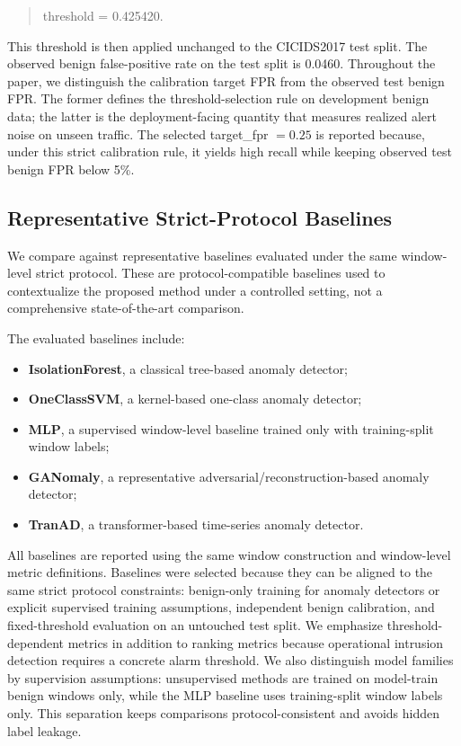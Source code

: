 \begin{quote}
threshold = 0.425420.
\end{quote}

This threshold is then applied unchanged to the CICIDS2017 test split. The observed benign false-positive rate on the test split is 0.0460. Throughout the paper, we distinguish the calibration target FPR from the observed test benign FPR. The former defines the threshold-selection rule on development benign data; the latter is the deployment-facing quantity that measures realized alert noise on unseen traffic. The selected target\_fpr \(=0.25\) is reported because, under this strict calibration rule, it yields high recall while keeping observed test benign FPR below 5\%.

\subsection{Representative Strict-Protocol Baselines}

We compare against representative baselines evaluated under the same window-level strict protocol. These are protocol-compatible baselines used to contextualize the proposed method under a controlled setting, not a comprehensive state-of-the-art comparison.

The evaluated baselines include:

\begin{itemize}
    \item \textbf{IsolationForest}, a classical tree-based anomaly detector;
    \item \textbf{OneClassSVM}, a kernel-based one-class anomaly detector;
    \item \textbf{MLP}, a supervised window-level baseline trained only with training-split window labels;
    \item \textbf{GANomaly}, a representative adversarial/reconstruction-based anomaly detector;
    \item \textbf{TranAD}, a transformer-based time-series anomaly detector.
\end{itemize}



All baselines are reported using the same window construction and window-level metric definitions. Baselines were selected because they can be aligned to the same strict protocol constraints: benign-only training for anomaly detectors or explicit supervised training assumptions, independent benign calibration, and fixed-threshold evaluation on an untouched test split. We emphasize threshold-dependent metrics in addition to ranking metrics because operational intrusion detection requires a concrete alarm threshold. We also distinguish model families by supervision assumptions: unsupervised methods are trained on model-train benign windows only, while the MLP baseline uses training-split window labels only. This separation keeps comparisons protocol-consistent and avoids hidden label leakage.

